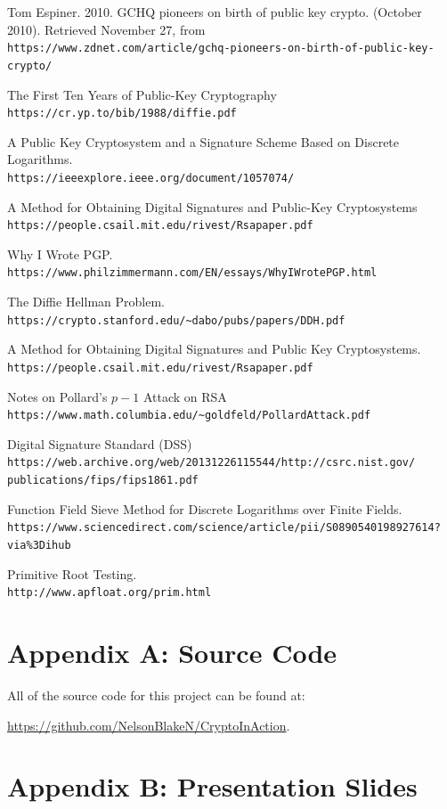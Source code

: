 \documentclass[12pt]{report}
\begin{document}
\newpage

\begin{thebibliography}{9}

    Tom Espiner. 2010. GCHQ pioneers on birth of public key crypto. (October 2010). Retrieved November 27, from \\
    \texttt{https://www.zdnet.com/article/gchq-pioneers-on-birth-of-public-key-crypto/}

    The First Ten Years of Public-Key Cryptography\\
    \texttt{https://cr.yp.to/bib/1988/diffie.pdf}

    A Public Key Cryptosystem and a Signature Scheme Based on Discrete Logarithms.\\
    \texttt{https://ieeexplore.ieee.org/document/1057074/}

    A Method for Obtaining Digital Signatures and Public-Key Cryptosystems\\
    \texttt{https://people.csail.mit.edu/rivest/Rsapaper.pdf}

    Why I Wrote PGP.\\
    \texttt{https://www.philzimmermann.com/EN/essays/WhyIWrotePGP.html}

    The Diffie Hellman Problem.\\
    \texttt{https://crypto.stanford.edu/\~{}dabo/pubs/papers/DDH.pdf}

    A Method for Obtaining Digital Signatures and Public Key Cryptosystems.\\
    \texttt{https://people.csail.mit.edu/rivest/Rsapaper.pdf}

    Notes on Pollard's $p-1$ Attack on RSA\\
    \texttt{https://www.math.columbia.edu/\~{}goldfeld/PollardAttack.pdf}

    Digital Signature Standard (DSS)\\
    \texttt{https://web.archive.org/web/20131226115544/http://csrc.nist.gov/\\publications/fips/fips1861.pdf}

    Function Field Sieve Method for Discrete Logarithms over Finite Fields.\\
    \texttt{https://www.sciencedirect.com/science/article/pii/S0890540198927614?via\%3Dihub}

    Primitive Root Testing.\\
    \texttt{http://www.apfloat.org/prim.html}

\end{thebibliography}

\newpage
\section{Appendix A: Source Code}
All of the source code for this project can be found at:

\href{https://github.com/NelsonBlakeN/CryptoInAction}{https://github.com/NelsonBlakeN/CryptoInAction}.

\newpage
\section{Appendix B: Presentation Slides}
\end{document}
